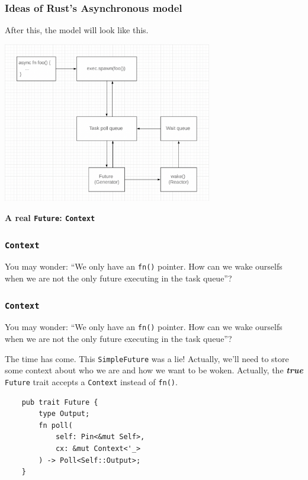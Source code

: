 \documentclass[aspectratio=1610,t]{beamer}
\begin{document}

\begin{frame}[fragile]
\frametitle{Ideas of Rust's Asynchronous model}
After this, the model will look like this.

\begin{center}
    \includegraphics[width=\textwidth,height=7cm,keepaspectratio]{images/real-model.png}
\end{center}
\end{frame}


\begin{frame}[c]
\centering\Huge\textbf{A real \texttt{Future}: \texttt{Context}}
\end{frame}


\begin{frame}[fragile]
\frametitle{\texttt{Context}}
You may wonder: ``We only have an \texttt{fn()} pointer. How can we wake ourselfs when we are not the only future executing in the task queue''?
\end{frame}


\begin{frame}[fragile]
\frametitle{\texttt{Context}}
You may wonder: ``We only have an \texttt{fn()} pointer. How can we wake ourselfs when we are not the only future executing in the task queue''?

The time has come. This \texttt{SimpleFuture} was a lie! Actually, we'll need to store some context about who we are and how we want to be woken. Actually, the \textit{\textbf{true}} \texttt{Future} trait accepts a \texttt{Context} instead of \texttt{fn()}.

\begin{verbatim}
    pub trait Future {
        type Output;
        fn poll(
            self: Pin<&mut Self>,
            cx: &mut Context<'_>
        ) -> Poll<Self::Output>;
    }
\end{verbatim}
\end{frame}
\end{document}
